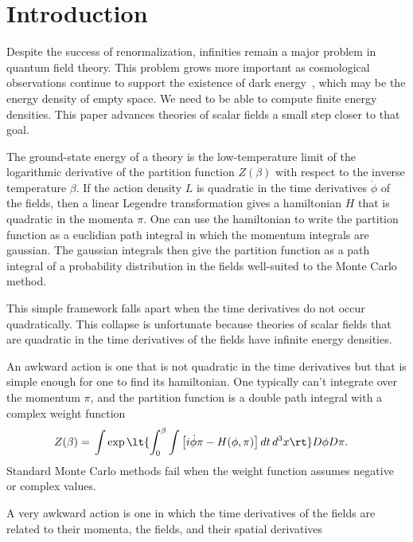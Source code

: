 \documentclass[prd,preprint,floatfix,showpacs]{revtex4-1}
\begin{document}
\section {Introduction
\label {Introduction} }
Despite the success of renormalization,
infinities remain a major problem
in quantum field theory. 
This problem
grows more important
as cosmological observations
continue to support the existence of 
dark energy~\cite{PlanckCosmologicalNA},
which may be the energy density 
of empty space.
We need to be able to compute 
finite energy densities. 
This paper advances
theories of scalar fields 
a small step closer to that goal.
\par
The ground-state energy
of a theory
is the low-temperature limit 
of the logarithmic derivative 
of the partition function \( Z(\beta) \)
with respect to the inverse temperature \( \beta \)\@.
If the action density \( L \) is quadratic
in the time derivatives \( \dot \phi \) 
of the fields,
then a linear Legendre transformation
gives a hamiltonian \( H \) that is
quadratic 
in the momenta \( \pi \)\@.
One can use the hamiltonian
to write the partition function
as a euclidian path integral
in which the momentum integrals
are gaussian.
The gaussian integrals then give
the partition function as 
a path integral of a probability
distribution in the fields well-suited
to the Monte Carlo method.
\par
This simple framework falls apart
when the time derivatives do not occur
quadratically.  
This collapse is unfortunate
because theories of scalar fields 
that are quadratic
in the time derivatives of the fields
have infinite energy densities.
\par
An awkward action is one that is not quadratic
in the time derivatives but that is simple
enough for one to find its hamiltonian.
One typically can't integrate over the momentum \( \pi \),
and the partition function is a double path integral
with a complex weight function~\cite{Weinberg1995IX}
\begin{align} 
Z(\beta) ={}& 
\int \exp \lt\{ \int_0^\beta \int \left[ i \dot \phi \pi 
- H(\phi, \pi) \right] dt \, d^3x \rt\} D\phi D\pi .
\label {the path integral for the partition function}
\end{align}
Standard Monte Carlo methods fail
when the weight function assumes negative
or complex values. 
\par
A very awkward action is one
in which the time derivatives of the fields
are related to their momenta, 
the fields, and their spatial derivatives
\end{document}
